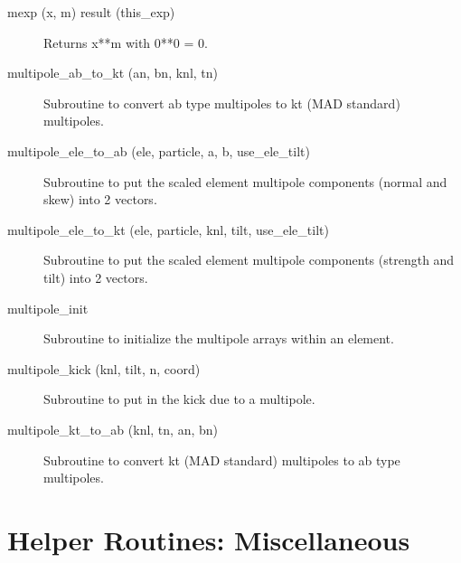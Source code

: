 \begin{description}

\item[mexp (x, m) result (this\_exp)] \Newline 
Returns x**m with 0**0 = 0.

\item[multipole\_ab\_to\_kt (an, bn, knl, tn)] \Newline
Subroutine to convert ab type multipoles to kt (MAD standard) multipoles. 

\item[multipole\_ele\_to\_ab (ele, particle, a, b, use\_ele\_tilt)] \Newline
Subroutine to put the scaled element multipole components (normal and skew) into 2 vectors. 

\item[multipole\_ele\_to\_kt (ele, particle, knl, tilt, use\_ele\_tilt)] \Newline
Subroutine to put the scaled element multipole components (strength and tilt) 
into 2 vectors. 

\item[multipole\_init] \Newline
Subroutine to initialize the multipole arrays within an element.

\item[multipole\_kick (knl, tilt, n, coord)] \Newline
Subroutine to put in the kick due to a multipole. 

\item[multipole\_kt\_to\_ab (knl, tn, an, bn)] \Newline
Subroutine to convert kt (MAD standard) multipoles to ab type multipoles. 

\end{description}

\section{Helper Routines: Miscellaneous}
\label{r:misc_help}

